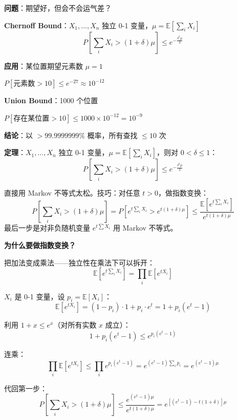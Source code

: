\documentclass[12pt, a4paper]{ctexart}
\begin{document}
\begin{blackboard}

\textbf{问题}：期望好，但会不会运气差？

\textbf{Chernoff Bound}：$X_1, \ldots, X_n$ 独立 0-1 变量，$\mu = \mathbb{E}[\sum_i X_i]$
\[
P\left[\sum_i X_i > (1+\delta)\mu\right] \leq e^{-\frac{\delta^2 \mu}{3}}
\]

\textbf{应用}：某位置期望元素数 $\mu = 1$

$P[\text{元素数} > 10] \leq e^{-27} \approx 10^{-12}$

\textbf{Union Bound}：1000 个位置

$P[\text{存在某位置} > 10] \leq 1000 \times 10^{-12} = 10^{-9}$

\textbf{结论}：以 $> 99.9999999\%$ 概率，所有查找 $\leq 10$ 次

\end{blackboard}


\begin{blackboard}

\textbf{定理}：$X_1, \ldots, X_n$ 独立 0-1 变量，$\mu = \mathbb{E}[\sum_i X_i]$，则对 $0 < \delta \leq 1$：
\[
P\left[\sum_i X_i > (1+\delta)\mu\right] \leq e^{-\frac{\delta^2 \mu}{3}}
\]

\end{blackboard}

\begin{blackboard}

直接用 Markov 不等式太松。技巧：对任意 $t > 0$，做指数变换：
\[
P\left[\sum_i X_i > (1+\delta)\mu\right] = P\left[e^{t\sum_i X_i} > e^{t(1+\delta)\mu}\right] \leq \frac{\mathbb{E}\left[e^{t\sum_i X_i}\right]}{e^{t(1+\delta)\mu}}
\]
最后一步是对非负随机变量 $e^{t\sum X_i}$ 用 Markov 不等式。

\textbf{为什么要做指数变换？}

把加法变成乘法——独立性在乘法下可以拆开：
\[
\mathbb{E}\left[e^{t\sum_i X_i}\right] = \prod_i \mathbb{E}\left[e^{tX_i}\right]
\]

\end{blackboard}

\begin{blackboard}

$X_i$ 是 0-1 变量，设 $p_i = \mathbb{E}[X_i]$：
\[
\mathbb{E}[e^{tX_i}] = (1-p_i) \cdot 1 + p_i \cdot e^t = 1 + p_i(e^t - 1)
\]

利用 $1 + x \leq e^x$（对所有实数 $x$ 成立）：
\[
1 + p_i(e^t - 1) \leq e^{p_i(e^t - 1)}
\]

连乘：
\[
\prod_i \mathbb{E}[e^{tX_i}] \leq \prod_i e^{p_i(e^t - 1)} = e^{(e^t - 1)\sum_i p_i} = e^{(e^t - 1)\mu}
\]

代回第一步：
\[
P\left[\sum_i X_i > (1+\delta)\mu\right] \leq \frac{e^{(e^t-1)\mu}}{e^{t(1+\delta)\mu}} = e^{\left[(e^t - 1) - t(1+\delta)\right]\mu}
\]

\end{blackboard}
\end{document}
